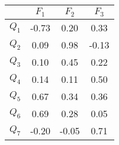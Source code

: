 \begin{tabular}{|l|c|c|c|}
\hline
&\textbf{$F_{1}$}&\textbf{$F_{2}$}&\textbf{$F_{3}$}\\\hline
\textbf{$Q_{1}$}&-0.73&0.20&0.33\\\hline
\textbf{$Q_{2}$}&0.09&0.98&-0.13\\\hline
\textbf{$Q_{3}$}&0.10&0.45&0.22\\\hline
\textbf{$Q_{4}$}&0.14&0.11&0.50\\\hline
\textbf{$Q_{5}$}&0.67&0.34&0.36\\\hline
\textbf{$Q_{6}$}&0.69&0.28&0.05\\\hline
\textbf{$Q_{7}$}&-0.20&-0.05&0.71\\\hline
\end{tabular}
